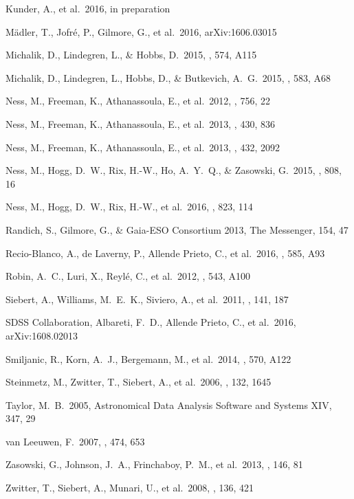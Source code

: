 \documentclass[preprint,trackchanges]{aastex}
\begin{document}
\begin{thebibliography}{dummy}
 Kunder, A., et al.\ 2016, in preparation

 M{\"a}dler, T., Jofr{\'e}, P., Gilmore, G., et al.\ 2016, arXiv:1606.03015 

 Michalik, D., Lindegren, L., \& Hobbs, D.\ 2015, \aap, 574, A115 

 Michalik, D., Lindegren, L., Hobbs, D., \& Butkevich, A.~G.\ 2015, \aap, 583, A68 

 Ness, M., Freeman, K., Athanassoula, E., et al.\ 2012, \apj, 756, 22 

 Ness, M., Freeman, K., Athanassoula, E., et al.\ 2013, \mnras, 430, 836 

 Ness, M., Freeman, K., Athanassoula, E., et al.\ 2013, \mnras, 432, 2092 

 Ness, M., Hogg, D.~W., Rix, H.-W., Ho, A.~Y.~Q., \& Zasowski, G.\ 2015, \apj, 808, 16 

 Ness, M., Hogg, D.~W., Rix, H.-W., et al.\ 2016, \apj, 823, 114 

 Randich, S., Gilmore, G., \& Gaia-ESO Consortium 2013, The Messenger, 154, 47 

 Recio-Blanco, A., de Laverny, P., Allende Prieto, C., et al.\ 2016, \aap, 585, A93 

 Robin, A.~C., Luri, X., Reyl{\'e}, C., et al.\ 2012, \aap, 543, A100 

 Siebert, A., Williams, M.~E.~K., Siviero, A., et al.\ 2011, \aj, 141, 187 

 SDSS Collaboration, Albareti, F.~D., Allende Prieto, C., et al.\ 2016, arXiv:1608.02013 

 Smiljanic, R., Korn, A.~J., Bergemann, M., et al.\ 2014, \aap, 570, A122 

 Steinmetz, M., Zwitter, T., Siebert, A., et al.\ 2006, \aj, 132, 1645 

 Taylor, M.~B.\ 2005, Astronomical Data Analysis Software and Systems XIV, 347, 29 

 van Leeuwen, F.\ 2007, \aap, 474, 653 

 Zasowski, G., Johnson, J.~A., Frinchaboy, P.~M., et al.\ 2013, \aj, 146, 81 

 Zwitter, T., Siebert, A., Munari, U., et al.\ 2008, \aj, 136, 421 

\end{thebibliography}
\end{document}
